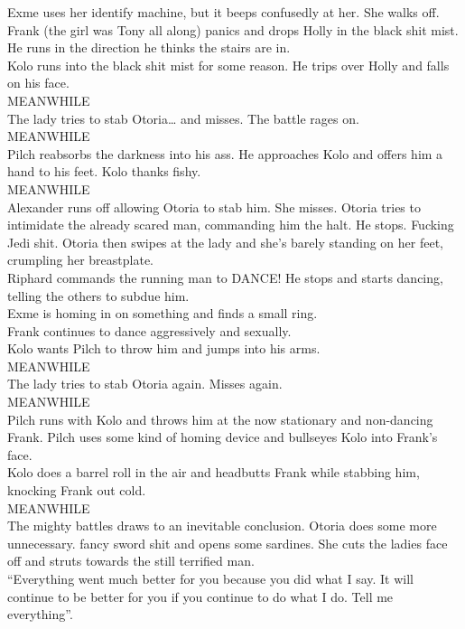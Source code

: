 Exme uses her identify machine, but it beeps confusedly at her. She walks off.\\
Frank (the girl was Tony all along) panics and drops Holly in the black shit mist. He runs in the direction he thinks the stairs are in.\\
Kolo runs into the black shit mist for some reason. He trips over Holly and falls on his face.\\
MEANWHILE\\
The lady tries to stab Otoria… and misses. The battle rages on.\\
MEANWHILE\\
Pilch reabsorbs the darkness into his ass. He approaches Kolo and offers him a hand to his feet. Kolo thanks fishy.\\
MEANWHILE\\
Alexander runs off allowing Otoria to stab him. She misses. Otoria tries to intimidate the already scared man, commanding him the halt. He stops. Fucking Jedi shit. Otoria then swipes at the lady and she’s barely standing on her feet, crumpling her breastplate.\\
Riphard commands the running man to DANCE! He stops and starts dancing, telling the others to subdue him.\\
Exme is homing in on something and finds a small ring.\\
Frank continues to dance aggressively and sexually.\\
Kolo wants Pilch to throw him and jumps into his arms.\\
MEANWHILE\\
The lady tries to stab Otoria again. Misses again.\\
MEANWHILE\\
Pilch runs with Kolo and throws him at the now stationary and non-dancing Frank. Pilch uses some kind of homing device and bullseyes Kolo into Frank’s face.\\
Kolo does a barrel roll in the air and headbutts Frank while stabbing him, knocking Frank out cold.\\
MEANWHILE\\
The mighty battles draws to an inevitable conclusion. Otoria does some more unnecessary. fancy sword shit and opens some sardines. She cuts the ladies face off and struts towards the still terrified man.\\
“Everything went much better for you because you did what I say. It will continue to be better for you if you continue to do what I do. Tell me everything”.\\
